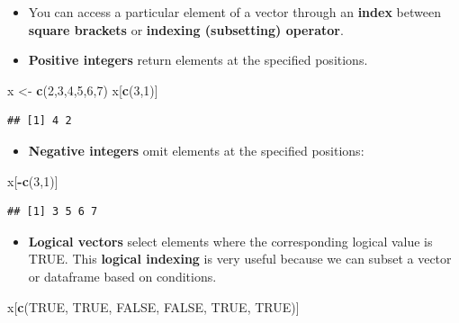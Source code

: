 \documentclass[]{book}
\newenvironment{Shaded}{\begin{snugshade}}{\end{snugshade}}
\newcommand{\DecValTok}[1]{\textcolor[rgb]{0.00,0.00,0.81}{#1}}
\newcommand{\KeywordTok}[1]{\textcolor[rgb]{0.13,0.29,0.53}{\textbf{#1}}}
\newcommand{\NormalTok}[1]{#1}
\newcommand{\OperatorTok}[1]{\textcolor[rgb]{0.81,0.36,0.00}{\textbf{#1}}}
\newcommand{\OtherTok}[1]{\textcolor[rgb]{0.56,0.35,0.01}{#1}}
\newcommand{\StringTok}[1]{\textcolor[rgb]{0.31,0.60,0.02}{#1}}
\providecommand{\tightlist}{%
  \setlength{\itemsep}{0pt}\setlength{\parskip}{0pt}}
\begin{document}
\begin{itemize}
\item
  You can access a particular element of a vector through an \textbf{index} between \textbf{square brackets} or \textbf{indexing (subsetting) operator}.
\item
  \textbf{Positive integers} return elements at the specified positions.
\end{itemize}

\begin{Shaded}
\begin{Highlighting}[]
\NormalTok{x <-}\StringTok{ }\KeywordTok{c}\NormalTok{(}\DecValTok{2}\NormalTok{,}\DecValTok{3}\NormalTok{,}\DecValTok{4}\NormalTok{,}\DecValTok{5}\NormalTok{,}\DecValTok{6}\NormalTok{,}\DecValTok{7}\NormalTok{)}
\NormalTok{x[}\KeywordTok{c}\NormalTok{(}\DecValTok{3}\NormalTok{,}\DecValTok{1}\NormalTok{)]}
\end{Highlighting}
\end{Shaded}

\begin{verbatim}
## [1] 4 2
\end{verbatim}

\begin{itemize}
\tightlist
\item
  \textbf{Negative integers} omit elements at the specified positions:
\end{itemize}

\begin{Shaded}
\begin{Highlighting}[]
\NormalTok{x[}\OperatorTok{-}\KeywordTok{c}\NormalTok{(}\DecValTok{3}\NormalTok{,}\DecValTok{1}\NormalTok{)]}
\end{Highlighting}
\end{Shaded}

\begin{verbatim}
## [1] 3 5 6 7
\end{verbatim}

\begin{itemize}
\tightlist
\item
  \textbf{Logical vectors} select elements where the corresponding logical value is TRUE. This \textbf{logical indexing} is very useful because we can subset a vector or dataframe based on conditions.
\end{itemize}

\begin{Shaded}
\begin{Highlighting}[]
\NormalTok{x[}\KeywordTok{c}\NormalTok{(}\OtherTok{TRUE}\NormalTok{, }\OtherTok{TRUE}\NormalTok{, }\OtherTok{FALSE}\NormalTok{, }\OtherTok{FALSE}\NormalTok{, }\OtherTok{TRUE}\NormalTok{, }\OtherTok{TRUE}\NormalTok{)]}
\end{Highlighting}
\end{Shaded}
\end{document}
